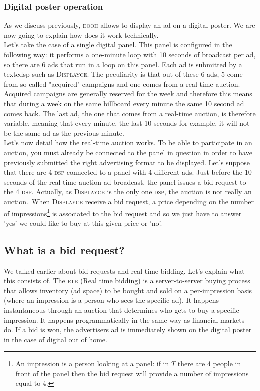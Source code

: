 \documentclass[12pt]{article}
\newcommand{\disp}{\textsc{Displayce}\xspace}
\begin{document}
\subsubsection{Digital poster operation}

As we discuss previously, \textsc{dooh} allows to display an ad on a digital poster. We are now going to explain how does it work technically. \\
Let's take the case of a single digital panel. This panel is configured in the following way: it performs a one-minute loop with 10 seconds of broadcast per ad, so there are 6 ads that run in a loop on this panel. Each ad is submitted by a textc{dsp} such as \disp. The peculiarity is that out of these 6 ads, 5 come from so-called "acquired" campaigns and one comes from a real-time auction. Acquired campaigns are generally reserved for the week and therefore this means that during a week on the same billboard every minute the same 10 second ad comes back. The last ad, the one that comes from a real-time auction, is therefore variable, meaning that every minute, the last 10 seconds for example, it will not be the same ad as the previous minute. \\

Let's now detail how the real-time auction works. To be able to participate in an auction, you must already be connected to the panel in question in order to have previously submitted the right advertising format to be displayed. Let's suppose that there are 4 \textsc{dsp} connected to a panel with 4 different ads. Just before the 10 seconds of the real-time auction ad broadcast, the panel issues a bid request to the 4 \textsc{dsp}. Actually, as \disp is the only one \textsc{dsp}, the auction is not really an auction. When \disp receive a bid request, a price depending on the number of impressions\footnote{An impression is a person looking at a panel: if in $T$ there are 4 people in front of the panel then the bid request will provide a number of impressions equal to 4.} is associated to the bid request and so we just have to answer 'yes' we could like to buy at this given price or 'no'.  

\subsection{What is a bid request?}

We talked earlier about bid requests and real-time bidding. Let's explain what this consists of. The \textsc{rtb} (Real time bidding) is a server-to-server buying process that allows inventory (ad space) to be bought and sold on a per-impression basis (where an impression is a person who sees the specific ad). It happens instantaneous through an auction that determines who gets to buy a specific impression. It happens programmatically in the same way as financial markets do. If a bid is won, the advertisers ad is immediately shown on the digital poster in the case of digital out of home. 
\end{document}
